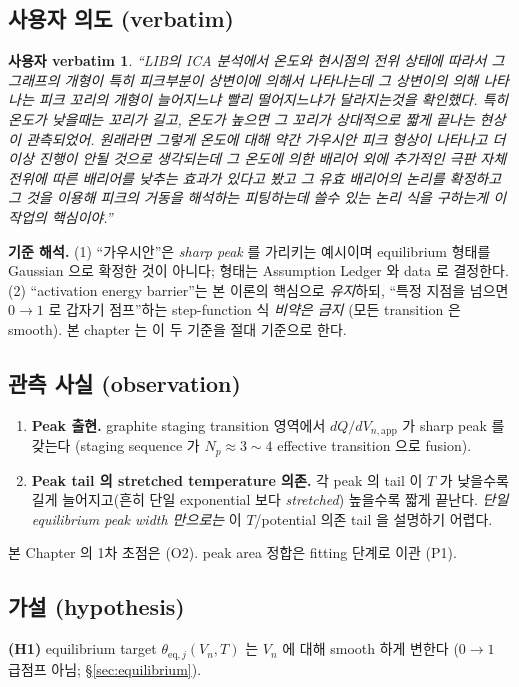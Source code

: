 \documentclass[11pt,a4paper]{article}
\newtheorem*{uservb}{사용자 verbatim}
\newcommand{\eq}{\mathrm{eq}}
\newcommand{\app}{\mathrm{app}}
\begin{document}
\subsection{사용자 의도 (verbatim)}\label{sec:verbatim}
\begin{uservb}
``LIB의 ICA 분석에서 온도와 현시점의 전위 상태에 따라서 그 그래프의 개형이 특히
피크부분이 상변이에 의해서 나타나는데 그 상변이의 의해 나타나는 피크 꼬리의 개형이
늘어지느냐 빨리 떨어지느냐가 달라지는것을 확인했다. 특히 온도가 낮을때는 꼬리가
길고, 온도가 높으면 그 꼬리가 상대적으로 짧게 끝나는 현상이 관측되었어. 원래라면
그렇게 온도에 대해 약간 가우시안 피크 형상이 나타나고 더이상 진행이 안될 것으로
생각되는데 그 온도에 의한 배리어 외에 추가적인 극판 자체 전위에 따른 배리어를
낮추는 효과가 있다고 봤고 그 유효 배리어의 논리를 확정하고 그 것을 이용해 피크의
거동을 해석하는 피팅하는데 쓸수 있는 논리 식을 구하는게 이 작업의 핵심이야.''
\end{uservb}

\textbf{기준 해석.} (1) ``가우시안''은 \emph{sharp peak} 를 가리키는
예시이며 equilibrium 형태를 Gaussian 으로 확정한 것이 아니다; 형태는 Assumption Ledger 와 data
로 결정한다. (2) ``activation energy barrier''는 본 이론의 핵심으로 \emph{유지}하되, ``특정
지점을 넘으면 $0\!\to\!1$ 로 갑자기 점프''하는 step-function 식 \emph{비약은 금지} (모든
transition 은 smooth). 본 chapter 는 이 두 기준을 절대 기준으로 한다.

\subsection{관측 사실 (observation)}\label{sec:observation}
\begin{enumerate}[label=\textbf{(O\arabic*)}]
\item \textbf{Peak 출현.} graphite staging transition 영역에서 $dQ/dV_{n,\app}$ 가 sharp
  peak 를 갖는다 (staging sequence 가 $N_p\approx3\sim4$ effective transition 으로 fusion).
\item \textbf{Peak tail 의 stretched temperature 의존.} 각 peak 의 tail 이 $T$ 가
  낮을수록 길게 늘어지고(흔히 단일 exponential 보다 \emph{stretched}) 높을수록 짧게
  끝난다. \emph{단일 equilibrium peak width 만으로는} 이 $T$/potential 의존 tail 을
  설명하기 어렵다.
\end{enumerate}
본 Chapter 의 1차 초점은 (O2). peak area 정합은 fitting 단계로 이관 (P1).

\subsection{가설 (hypothesis)}\label{sec:hypothesis}
\textbf{(H1)} equilibrium target $\theta_{\eq,j}(V_n,T)$ 는 $V_n$ 에 대해 smooth 하게
변한다 ($0\!\to\!1$ 급점프 아님; \S\ref{sec:equilibrium}).
\end{document}
